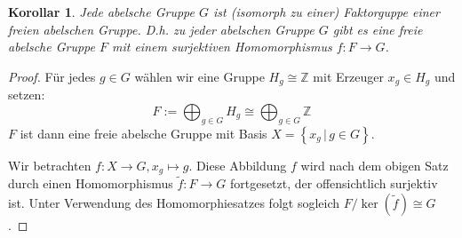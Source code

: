 \documentclass[12pt]{scrartcl} %
\newtheorem{kor}[thm]{Korollar}
\theoremstyle{definition}
\theoremstyle{remark}
\begin{document}
\begin{kor}
  Jede abelsche Gruppe $G$ ist (isomorph zu einer) Faktorguppe einer freien abelschen Gruppe. D.h. zu jeder abelschen Gruppe $G$ gibt es eine freie abelsche Gruppe $F$ mit einem surjektiven Homomorphismus $f: F \to G$.
\end{kor}

\begin{proof}
  Für jedes $g \in G$ wählen wir eine Gruppe $H_g \cong \mathbb{Z}$ mit Erzeuger $x_g \in H_g$ und setzen:
  \[ F := \bigoplus_{g \in G} H_g \cong \bigoplus_{g \in G} \mathbb{Z} \]
  $F$ ist dann eine freie abelsche Gruppe mit Basis $X = \left\{  x_g \,\vert\, g \in G \right\}$.

  Wir betrachten $f : X \to G, x_g \mapsto g$. Diese Abbildung $f$ wird nach dem obigen Satz durch einen Homomorphismus $\tilde{f}: F\to G$ fortgesetzt, der offensichtlich surjektiv ist. 
  Unter Verwendung des Homomorphiesatzes folgt sogleich $F / \ker(\tilde f) \cong G$.
\end{proof}
\end{document}
